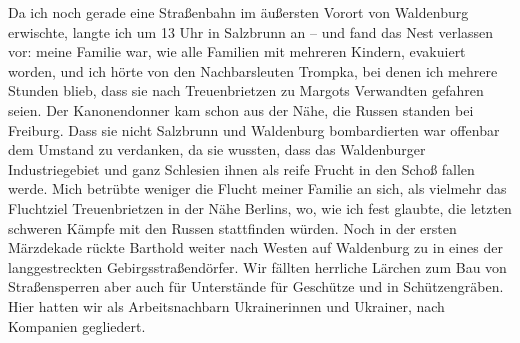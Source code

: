 Da ich noch gerade eine Straßenbahn im äußersten Vorort von Waldenburg erwischte, langte ich um 13 Uhr in Salzbrunn an -- und fand das Nest verlassen vor: meine Familie war, wie alle Familien mit mehreren Kindern, evakuiert worden, und ich hörte von den Nachbarsleuten Trompka, bei denen ich mehrere Stunden blieb, dass sie nach Treuenbrietzen zu Margots Verwandten gefahren seien. Der Kanonendonner kam schon aus der Nähe, die Russen standen bei Freiburg. Dass sie nicht Salzbrunn und Waldenburg bombardierten war offenbar dem Umstand zu verdanken, da sie wussten, dass das Waldenburger Industriegebiet und ganz Schlesien ihnen als reife Frucht in den Schoß fallen werde. Mich betrübte weniger die Flucht meiner Familie an sich, als vielmehr das Fluchtziel Treuenbrietzen in der Nähe Berlins, wo, wie ich fest glaubte, die letzten schweren Kämpfe mit den Russen stattfinden würden. Noch in der ersten Märzdekade rückte Barthold weiter nach Westen auf Waldenburg zu in eines der langgestreckten Gebirgsstraßendörfer. Wir fällten herrliche Lärchen zum Bau von Straßensperren aber auch für Unterstände für Geschütze und in Schützengräben. Hier hatten wir als Arbeitsnachbarn Ukrainerinnen und Ukrainer, nach Kompanien gegliedert.




